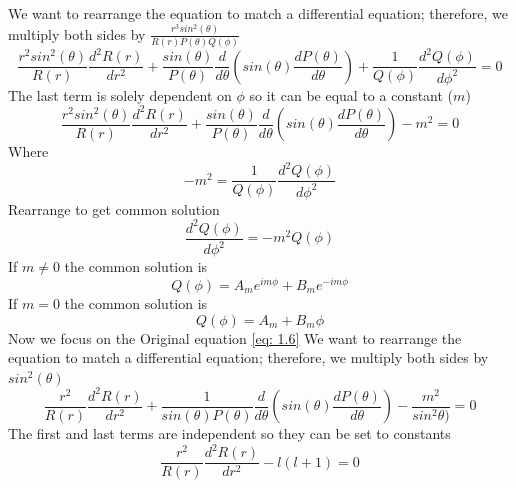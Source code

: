 \documentclass[12pt]{article}
\begin{document}
    We want to rearrange the equation to match a differential equation; therefore, we multiply both sides by $\frac{r^3 sin^2(\theta)}{R(r) P(\theta) Q(\phi)}$
    \begin{equation} \label{eq: 1.5}
        \frac{r^2 sin^2(\theta)}{R(r)} \frac{d^2 R(r)}{dr^2} + \frac{sin(\theta)}{P(\theta)} \frac{d}{d\theta}\left(sin(\theta) \frac{dP(\theta)}{d\theta}\right) + \frac{1}{Q(\phi)} \frac{d^2Q(\phi)}{d\phi^2} = 0
    \end{equation}
    The last term is solely dependent on $\phi$ so it can be equal to a constant ($m$)
    \begin{equation} \label{eq: 1.6}
        \frac{r^2 sin^2(\theta)}{R(r)} \frac{d^2 R(r)}{dr^2} + \frac{sin(\theta)}{P(\theta)} \frac{d}{d\theta}\left(sin(\theta) \frac{dP(\theta)}{d\theta}\right) - m^2 = 0
    \end{equation}
    Where 
    \begin{equation} \label{eq: 1.7}
         -m^2 = \frac{1}{Q(\phi)} \frac{d^2Q(\phi)}{d\phi^2}
    \end{equation}
    Rearrange to get common solution
    \begin{equation} \label{eq: 1.8}
        \frac{d^2Q(\phi)}{d\phi^2} = -m^2 Q(\phi)
    \end{equation}
    If $m\neq0$ the common solution is 
    \begin{equation} \label{eq: 1.9}
        Q(\phi) = A_m e^{im\phi} + B_m e^{-im\phi}
    \end{equation}
    If $m=0$ the common solution is 
    \begin{equation} \label{eq: 1.10}
        Q(\phi) = A_m + B_m \phi
    \end{equation}
    Now we focus on the Original equation \ref{eq: 1.6}
    \newline  We want to rearrange the equation to match a differential equation; therefore, we multiply both sides by $sin^2(\theta)$ 
    \begin{equation} \label{eq: 1.11}
        \frac{r^2}{R(r)} \frac{d^2 R(r)}{dr^2} + \frac{1}{sin(\theta) P(\theta)} \frac{d}{d\theta}\left(sin(\theta) \frac{dP(\theta)}{d\theta}\right) - \frac{m^2}{sin^2\theta)} = 0
    \end{equation}
    The first and last terms are independent so they can be set to constants
    \begin{equation} \label{eq: 1.12}
        \frac{r^2}{R(r)} \frac{d^2 R(r)}{dr^2} - l (l+1) = 0
    \end{equation}
\end{document}
